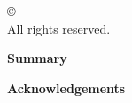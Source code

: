 
  \cleardoublepage
  \thispagestyle{empty}
  \begin{center}
    \copyright\ \nombreautor\ \anio \\
    All rights reserved.
  \end{center}



  \cleardoublepage
   
  \begin{center} \Large \textbf{Summary} \end{center}
  \resumen


  \cleardoublepage {}
  \begin{center} \Large \textbf{Acknowledgements} \end{center}
  \agradecimientos


  \cleardoublepage \vspace*{1.5in}
  \begin{flushright} \dedicatoria \end{flushright}


  \cleardoublepage
  \tableofcontents
  \cleardoublepage
  \listoffigures
  \cleardoublepage
  \listoftables
  \cleardoublepage

  \normalsize

